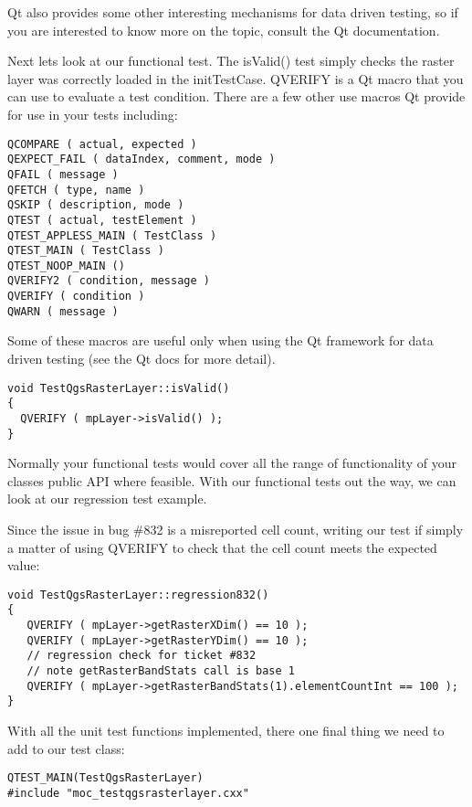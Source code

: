 Qt also provides some other interesting mechanisms for data driven 
testing, so if you are interested to know more on the topic, consult 
the Qt documentation.

Next lets look at our functional test. The isValid() test simply checks the
raster layer was correctly loaded in the initTestCase.  QVERIFY is a Qt macro
that you can use to evaluate a test condition.  There are a few other use
macros Qt provide for use in your tests including:

\begin{verbatim}
QCOMPARE ( actual, expected )
QEXPECT_FAIL ( dataIndex, comment, mode )
QFAIL ( message )
QFETCH ( type, name )
QSKIP ( description, mode )
QTEST ( actual, testElement )
QTEST_APPLESS_MAIN ( TestClass )
QTEST_MAIN ( TestClass )
QTEST_NOOP_MAIN ()
QVERIFY2 ( condition, message )
QVERIFY ( condition )
QWARN ( message ) 
\end{verbatim}

Some of these macros are useful only when using the Qt framework for data
driven testing (see the Qt docs for more detail).

\begin{verbatim}
void TestQgsRasterLayer::isValid()
{
  QVERIFY ( mpLayer->isValid() );
}
\end{verbatim}

Normally your functional tests would cover all the range of functionality of
your classes public API where feasible. With our functional tests out the way,
we can look at our regression test example.

Since the issue in bug \#832 is a misreported cell count, writing our test if
simply a matter of using QVERIFY to check that the cell count meets the
expected value:

\begin{verbatim}
void TestQgsRasterLayer::regression832()
{
   QVERIFY ( mpLayer->getRasterXDim() == 10 );
   QVERIFY ( mpLayer->getRasterYDim() == 10 );
   // regression check for ticket #832
   // note getRasterBandStats call is base 1
   QVERIFY ( mpLayer->getRasterBandStats(1).elementCountInt == 100 );
}
\end{verbatim}

With all the unit test functions implemented, there one final thing we need to
add to our test class:

\begin{verbatim}
QTEST_MAIN(TestQgsRasterLayer)
#include "moc_testqgsrasterlayer.cxx"
\end{verbatim}

